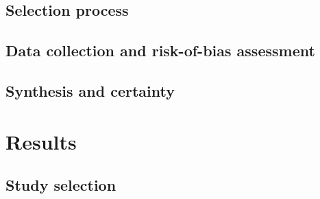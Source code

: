 \documentclass[12pt,a4paper]{article}
\begin{document}
\subsection{Selection process}

\subsection{Data collection and risk-of-bias assessment}

\subsection{Synthesis and certainty}

\section{Results}

\subsection{Study selection}
\label{sec:selection}
\end{document}

